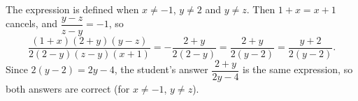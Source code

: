 The expression is defined when $x\ne-1$, $y\ne2$ and $y\ne z$. Then $1+x=x+1$ cancels, and $\dfrac{y-z}{z-y}=-1$, so
\[
\dfrac{(1+x)(2+y)(y-z)}{2(2-y)(z-y)(x+1)}=-\dfrac{2+y}{2(2-y)}=\dfrac{2+y}{2(y-2)}=\boxed{\dfrac{y+2}{2(y-2)}} .
\]
Since $2(y-2)=2y-4$, the student's answer $\dfrac{2+y}{2y-4}$ is the same expression, so both answers are correct (for $x\ne-1$, $y\ne z$).
